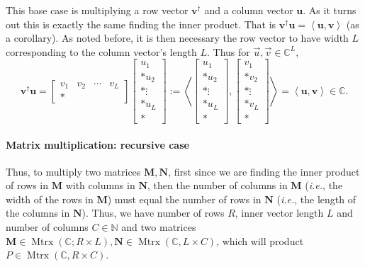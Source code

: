 \documentclass{article}
\begin{document}
This base case is multiplying a row vector $\mathbf{v}^\dagger$ and a column vector $\mathbf{u}$. As it turns out this is exactly the same finding the inner product. That is $\mathbf{v}^\dagger\mathbf{u} = \left<\mathbf{u},\mathbf{v}\right>$ (as a corollary). As noted before, it is then necessary the row vector to have width $L$ corresponding to the column vector's length $L$.
Thus for $\vec{u},\vec{v} \in \mathbb{C}^L$,
\begin{equation}
    \mathbf{v}^\dagger\mathbf{u} = \left[
        \begin{matrix}
            v_1 & v_2 & \cdots & v_L \\*
        \end{matrix}
    \right]
    \left[
        \begin{matrix}
            u_1 \\* u_2 \\* \vdots \\* u_L \\*
        \end{matrix}
    \right] := \left<
        \left[
            \begin{matrix}
                u_1 \\* u_2 \\* \vdots \\* u_L \\*
            \end{matrix}
        \right],
        \left[
            \begin{matrix}
                v_1 \\* v_2 \\* \vdots \\* v_L \\*
            \end{matrix}
        \right]
    \right> = \left<\mathbf{u},\mathbf{v}\right> \in \mathbb{C}.
\end{equation}

\paragraph{Matrix multiplication: recursive case}

Thus, to multiply two matrices $\mathbf{M}, \mathbf{N}$, first since we are finding the inner product of rows in $\mathbf{M}$ with columns in $\mathbf{N}$, then the number of columns in $\mathbf{M}$ (\textit{i.e.}, the width of the rows in $\mathbf{M}$) must equal the number of rows in $\mathbf{N}$ (\textit{i.e.}, the length of the columns in $\mathbf{N}$). Thus, we have number of rows $R$, inner vector length $L$ and number of columns $C \in \mathbb{N}$ and
two matrices $\mathbf{M} \in \operatorname{Mtrx}(\mathbb{C}; R\times L), \mathbf{N} \in \operatorname{Mtrx}(\mathbb{C}, L\times C)$, which will product $P \in \operatorname{Mtrx}(\mathbb{C},R\times C)$.
\end{document}
